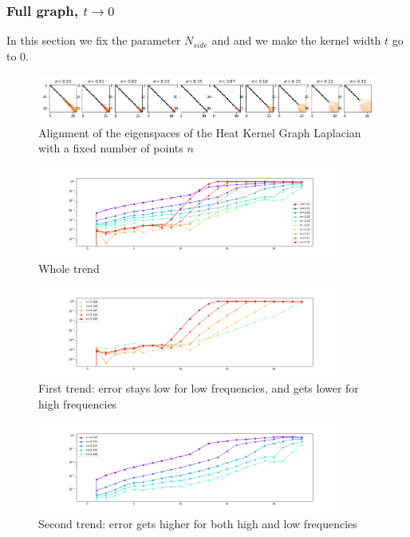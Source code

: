 \subsubsection{Full graph, $t\to 0$}
In this section we fix the parameter $N_{side}$ and and we make the kernel width $t$ go to $0$. 
\begin{figure}[h]
	\label{fig:t_sensitivity_eigenspaces}
	\caption{Alignment of the eigenspaces of the Heat Kernel Graph Laplacian with a fixed number of points $n$}
	\centering
	\includegraphics[width=1\textwidth]{../codes/02.HeatKernelGraphLaplacian/HEALPix/06_figures/t_sensitivity.png}
	
\end{figure}
\begin{figure}
	\centering
	\includegraphics[width=0.9\textwidth]{../codes/02.HeatKernelGraphLaplacian/HEALPix/06_figures/t_sensitivity_diagonal.png}
	\caption{Whole trend}
	\label{fig:t_sensitivity_diagonal}
\end{figure}%
\begin{figure}
	\centering
	\includegraphics[width=0.9\textwidth]{../codes/02.HeatKernelGraphLaplacian/HEALPix/06_figures/t_sensitivity_diagonal_2.png}
	\caption{First trend: error stays low for low frequencies, and gets lower for high frequencies}
	\label{fig:t_sensitivity_diagonal_2}
	\vspace{0.5cm}
\end{figure}
\begin{figure}
	\centering
	\includegraphics[width=0.9\textwidth]{../codes/02.HeatKernelGraphLaplacian/HEALPix/06_figures/t_sensitivity_diagonal_1.png}
	\caption{Second trend: error gets higher for both high and low frequencies}
	\label{fig:t_sensitivity_diagonal_1}
\end{figure}%

